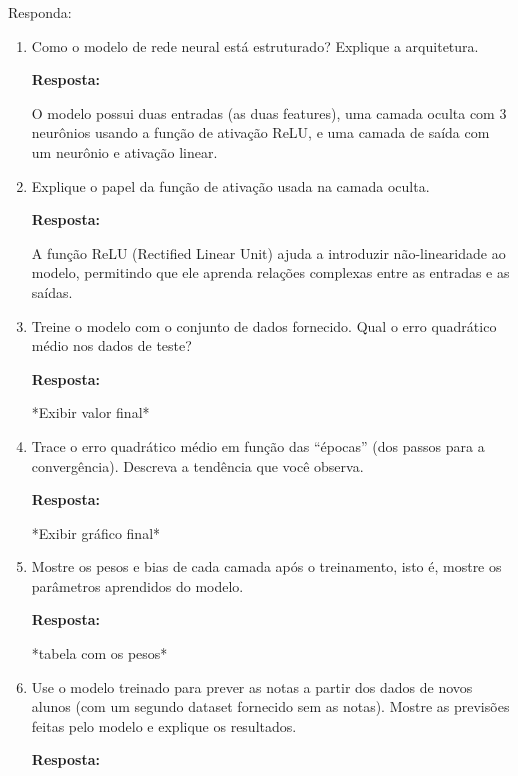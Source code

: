 \documentclass[12 pt]{article}
\begin{document}
Responda:

\begin{enumerate}
    \item Como o modelo de rede neural está estruturado? Explique a arquitetura.
    
    \textbf{Resposta:} \par

    O modelo possui duas entradas (as duas features), uma camada oculta com 3 neurônios usando a função de ativação ReLU, e uma camada de saída com um neurônio e ativação linear.

    \item Explique o papel da função de ativação usada na camada oculta.
   
    \textbf{Resposta:} \par

    A função ReLU (Rectified Linear Unit) ajuda a introduzir não-linearidade ao modelo, permitindo que ele aprenda relações complexas entre as entradas e as saídas.

    \item Treine o modelo com o conjunto de dados fornecido. Qual o erro quadrático médio nos dados de teste?
       
    \textbf{Resposta:} \par

    *Exibir valor final*

    \item Trace o erro quadrático médio em função das “épocas” (dos passos para a convergência). Descreva a tendência que você observa.
       
    \textbf{Resposta:} \par

    *Exibir gráfico final*

    \item Mostre os pesos e bias de cada camada após o treinamento, isto é, mostre os parâmetros aprendidos do modelo.
       
    \textbf{Resposta:} \par

    *tabela com os pesos*

    \item Use o modelo treinado para prever as notas a partir dos dados de novos alunos (com um segundo dataset fornecido sem as notas). Mostre as previsões feitas pelo modelo e explique os resultados.
       
    \textbf{Resposta:} \par


\end{enumerate}
\end{document}
